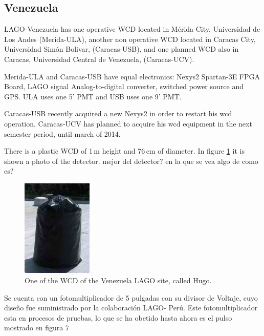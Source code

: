\subsection{Venezuela}\label{subsec:ven}

LAGO-Venezuela has one operative WCD located in M\'erida City, Universidad de
Los Andes (Merida-ULA), another non operative WCD located in Caracas City,
Universidad Sim\'on Bolivar, (Caracas-USB), and one planned WCD also in
Caracas, Universidad Central de Venezuela, (Caracas-UCV).

Merida-ULA and Caracas-USB have equal electronics: Nexys2 Spartan-3E FPGA
Board, LAGO signal Analog-to-digital converter, switched power source and GPS.
ULA uses one 5' PMT and USB uses one 9' PMT. 

Caracas-USB recently acquired a new Nexys2 in order to restart his wcd
operation. Caracas-UCV has planned to acquire his wcd equipment in the next
semester period, until march of 2014.

There is a plastic WCD of 1\,m height and 76\,cm of diameter. In figure
\ref{fig:wcd-ven} it is shown a photo of the detector. %
mejor del detector? en la que se vea algo de como es?
 
\begin{figure}[htp!]
\centering
\includegraphics[width=0.30\textwidth,height=0.2\textheight]{images/venezuela/hugo.jpg}
\caption{One of the WCD of the Venezuela LAGO site, called Hugo.}
\label{fig:wcd-ven}
\end{figure}  

Se cuenta con un fotomultiplicador de 5 pulgadas con su divisor de Voltaje,
cuyo diseño fue suministrado por la colaboración LAGO- Perú. Este
fotomultiplicador esta en procesos de pruebas, lo que se ha obetido hasta ahora
es el pulso mostrado en figura 7
  

